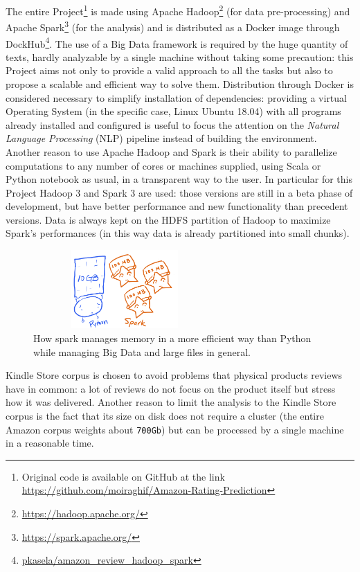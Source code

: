 \documentclass[fleqn,10pt]{SelfArx}
\begin{document}
The entire Project\footnote{Original code is available on GitHub at the link \url{https://github.com/moiraghif/Amazon-Rating-Prediction}} is made using Apache Hadoop\footnote{\url{https://hadoop.apache.org/}} (for data pre-processing) and Apache Spark\footnote{\url{https://spark.apache.org/}} (for the analysis) and is distributed as a Docker image through DockHub\footnote{\url{pkasela/amazon_review_hadoop_spark}}.
The use of a Big Data framework is required by the huge quantity of texts, hardly analyzable by a single machine without taking some precaution: this Project aims not only to provide a valid approach to all the tasks but also to propose a scalable and efficient way to solve them.
Distribution through Docker is considered necessary to simplify installation of dependencies: providing a virtual Operating System (in the specific case, Linux Ubuntu 18.04) with all programs already installed and configured is useful to focus the attention on the \textit{Natural Language Processing} (NLP) pipeline instead of building the environment.\newline
Another reason to use Apache Hadoop and Spark is their ability to parallelize computations to any number of cores or machines supplied, using Scala or Python notebook as usual, in a transparent way to the user.
In particular for this Project Hadoop 3 and Spark 3 are used: those versions are still in a beta phase of development, but have better performance and new functionality than precedent versions.
Data is always kept on the HDFS partition of Hadoop to maximize Spark's performances (in this way data is already partitioned into small chunks).
\begin{figure}[!h]
    \centering
    \includegraphics[width=7cm, height=3cm]{pyspark-work.png}
    \caption{How spark manages memory in a more efficient way than Python while managing Big Data and large files in general.}
\end{figure}

Kindle Store corpus is chosen to avoid problems that physical products reviews have in common: a lot of reviews do not focus on the product itself but stress how it was delivered.
Another reason to limit the analysis to the Kindle Store corpus is the fact that its size on disk does not require a cluster (the entire Amazon corpus weights about \verb|700Gb|) but can be processed by a single machine in a reasonable time.
\end{document}
